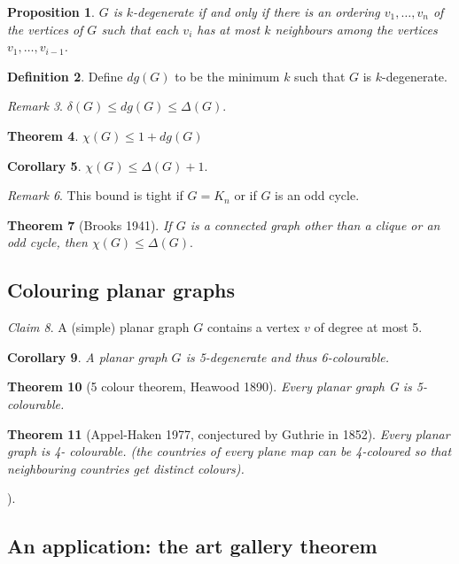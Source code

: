 \documentclass[10pt, fleqn, a4paper, landscape]{article}
\theoremstyle{plain} %
\newtheorem{thm}{Theorem}
\newtheorem{pro}[thm]{Proposition}
\newtheorem{cor}[thm]{Corollary}
\theoremstyle{remark} %
\newtheorem{rem}[thm]{Remark}
\newtheorem{claim}[thm]{Claim}
\theoremstyle{definition} %
\newtheorem{defi}[thm]{Definition}
\begin{document}
\begin{multicols}{3}
\begin{tiny}
\begin{pro}
$G$ is $k$-degenerate if and only if there is an ordering $v_1, \dots , v_n$ of the vertices of $G$ such that each $v_i$ has at most $k$ neighbours among the vertices $v_1, \dots , v_{i-1}$.
\end{pro}

\begin{defi}
Define $dg(G)$ to be the minimum $k$ such that $G$ is $k$-degenerate.
\end{defi}
\begin{rem}
$\delta(G) \le dg(G) \le \Delta(G)$.
\end{rem}

\begin{thm}
$\chi(G) \le 1 + dg(G)$
\end{thm}

\begin{cor}
$\chi(G) \le \Delta(G) + 1.$
\end{cor}

\begin{rem}
This bound is tight if $G = K_n$ or if $G$ is an odd cycle.
\end{rem}

\begin{thm}[Brooks 1941]
If $G$ is a connected graph other than a clique or an odd cycle, then
$\chi(G) \le \Delta(G).$
\end{thm}

\subsection{Colouring planar graphs}
\begin{claim}
A (simple) planar graph $G$ contains a vertex $v$ of degree at most 5.
\end{claim}

\begin{cor}
A planar graph $G$ is 5-degenerate and thus 6-colourable.
\end{cor}
\begin{thm}[5 colour theorem, Heawood 1890]
Every planar graph G is 5-colourable.
\end{thm}

\begin{thm}[Appel-Haken 1977, conjectured by Guthrie in 1852]
Every planar graph is 4-
colourable. (the countries of every plane map can be 4-coloured so that neighbouring countries get
distinct colours).
\end{thm}). 
\addtocounter{thm}{1}
\subsection{An application: the art gallery theorem}


\end{tiny}
\end{multicols}
\end{document}

